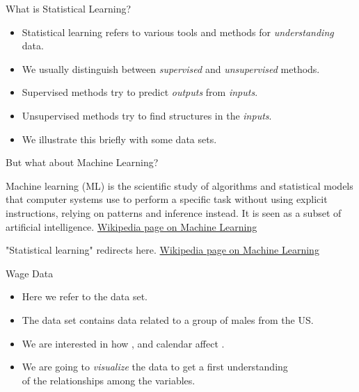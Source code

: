 \documentclass[mathserif, aspectratio=169]{beamer}
\begin{document}
\begin{frame}{What is Statistical Learning?}
	\begin{itemize}
		\item Statistical learning refers to various tools and methods for \emph{understanding} data.
		\item We usually distinguish between \emph{supervised} and \emph{unsupervised} methods.
		\item Supervised methods try to predict \emph{outputs} from \emph{inputs}.
		\item Unsupervised methods try to find structures in the \emph{inputs}.
		\item We illustrate this briefly with some data sets.
	\end{itemize}
\end{frame}

\begin{frame}{But what about Machine Learning?}
	\begin{Quote}%
		{Machine learning (ML) is the scientific study of algorithms and
		statistical models that computer systems use to perform a specific task
		without using explicit instructions, relying on patterns and inference
		instead. It is seen as a subset of artificial intelligence.}%
		{\href{https://en.wikipedia.org/wiki/Machine_learning}{Wikipedia page on Machine Learning}}
	\end{Quote}
	\begin{Quote}%
		{"Statistical learning" redirects here.}%
		{\href{https://en.wikipedia.org/wiki/Machine_learning}{Wikipedia page on Machine Learning}}
	\end{Quote}
\end{frame}

\begin{frame}{Wage Data}
	\begin{itemize}
		\item Here we refer to the  data set.
		\item The  data set contains data related to a group of males from the US.
		\item We are interested in how ,  and
			calendar  affect .
		\item We are going to \emph{visualize} the data to get a first understanding\\
			of the relationships among the variables.
	\end{itemize}
\end{frame}
\end{document}
